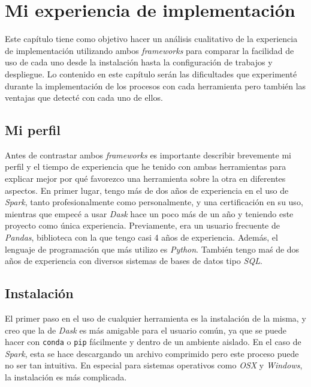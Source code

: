 \chapter{Mi experiencia de implementación}

\noindent Este capítulo tiene como objetivo hacer un análisis cualitativo de la experiencia de implementación utilizando ambos \textit{frameworks} para comparar la facilidad de uso de cada uno desde la instalación hasta la configuración de trabajos y despliegue. Lo contenido en este capítulo serán las dificultades que experimenté durante la implementación de los procesos con cada herramienta pero también las ventajas que detecté con cada uno de ellos.

\section{Mi perfil}

Antes de contrastar ambos \textit{frameworks} es importante describir brevemente mi perfil y el tiempo de experiencia que he tenido con ambas herramientas para explicar mejor por qué favorezco una herramienta sobre la otra en diferentes aspectos. En primer lugar, tengo más de dos años de experiencia en el uso de \textit{Spark}, tanto profesionalmente como personalmente, y una certificación en su uso, mientras que empecé a usar \textit{Dask} hace un poco más de un año y teniendo este proyecto como única experiencia. Previamente, era un usuario frecuente de \textit{Pandas}, biblioteca con la que tengo casi 4 años de experiencia. Además, el lenguaje de programación que más utilizo es \textit{Python}. También tengo maś de dos años de experiencia con diversos sistemas de bases de datos tipo \textit{SQL}.

\newpage

\section{Instalación}

El primer paso en el uso de cualquier herramienta es la instalación de la misma, y creo que la de \textit{Dask} es más amigable para el usuario común, ya que se puede hacer con \texttt{conda} o \texttt{pip} fácilmente y dentro de un ambiente aislado. En el caso de \textit{Spark}, esta se hace descargando un archivo comprimido pero este proceso puede no ser tan intuitiva. En especial para sistemas operativos como \textit{OSX} y \textit{Windows}, la instalación es más complicada.

